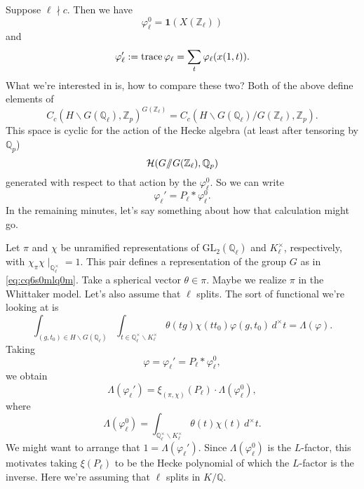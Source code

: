 \documentclass[reqno]{amsart} 
\numberwithin{theorem}{section}
\numberwithin{equation}{section}
\numberwithin{exercise}{section}
\begin{document}
Suppose $\ell \nmid c$.  Then we have
\begin{equation*}
  \varphi_{\ell}^0 = \mathbf{1}(X(\mathbb{Z}_{\ell}))
\end{equation*}
and
\begin{equation*}
  \varphi_{\ell} ' := \operatorname{trace} \varphi_{\ell} = \sum_t \varphi_{\ell}(x(1, t)).
\end{equation*}
What we're interested in is, how to compare these two?  Both of the above define elements of
\begin{equation*}
  C_c(H \backslash G(\mathbb{Q}_{\ell}), \mathbb{Z}_p)^{G(\mathbb{Z}_\ell)}
  =
  C_c(H \backslash G(\mathbb{Q}_{\ell}) / G(\mathbb{Z}_\ell), \mathbb{Z}_p).
\end{equation*}
This space is cyclic for the action of the Hecke algebra (at least after tensoring by $\mathbb{Q}_p$)
\begin{equation*}
  \mathcal{H}(G /\!\!/ G(\mathbb{Z}_{\ell}), \mathbb{Q}_p)
\end{equation*}
generated with respect to that action by the $\varphi_{\ell}^0$.  So we can write
\begin{equation*}
  \varphi_{\ell} ' = P_{\ell} \ast \varphi_{\ell}^0.
\end{equation*}
In the remaining minutes, let's say something about how that calculation might go.

Let $\pi$ and $\chi$ be unramified representations of $\mathrm{GL}_2(\mathbb{Q}_{\ell})$ and $K_{\ell}^\times$, respectively, with $\chi_\pi \chi \mid_{\mathbb{Q}_{\ell}^\times} = 1$.  This pair defines a representation of the group $G$ as in \eqref{eq:cq6s0mlq0m}.  Take a spherical vector $\theta \in \pi$.  Maybe we realize $\pi$ in the Whittaker model.  Let's also assume that $\ell$ splits.  The sort of functional we're looking at is
\begin{equation*}
  \int_{(g, t_0) \in H \backslash G(\mathbb{Q}_{\ell})}
  \int_{t \in \mathbb{Q}_{\ell}^\times \backslash K_{\ell}^\times}
  \theta(t g)
  \chi(t t_0)
  \varphi(g, t_0)
  \,d^\times t
  = \Lambda(\varphi).
\end{equation*}
Taking
\begin{equation*}
  \varphi = \varphi_{\ell} ' = P_{\ell} \ast \varphi_{\ell}^0,
\end{equation*}
we obtain
\begin{equation*}
  \Lambda(\varphi_{\ell} ') = \xi_{(\pi, \chi)}(P_{\ell}) \cdot \Lambda(\varphi_{\ell}^0),
\end{equation*}
where
\begin{equation*}
  \Lambda(\varphi_{\ell}^0) = \int_{\mathbb{Q}_{\ell}^\times \backslash K_{\ell}^\times} \theta(t) \chi(t) \,d^\times t.
\end{equation*}
We might want to arrange that $1 = \Lambda(\varphi_{\ell} ')$.  Since $\Lambda(\varphi_{\ell}^0)$ is the $L$-factor, this motivates taking $\xi(P_{\ell})$ to be the Hecke polynomial of which the $L$-factor is the inverse.  Here we're assuming that $\ell$ splits in $K / \mathbb{Q}$.
\end{document}
